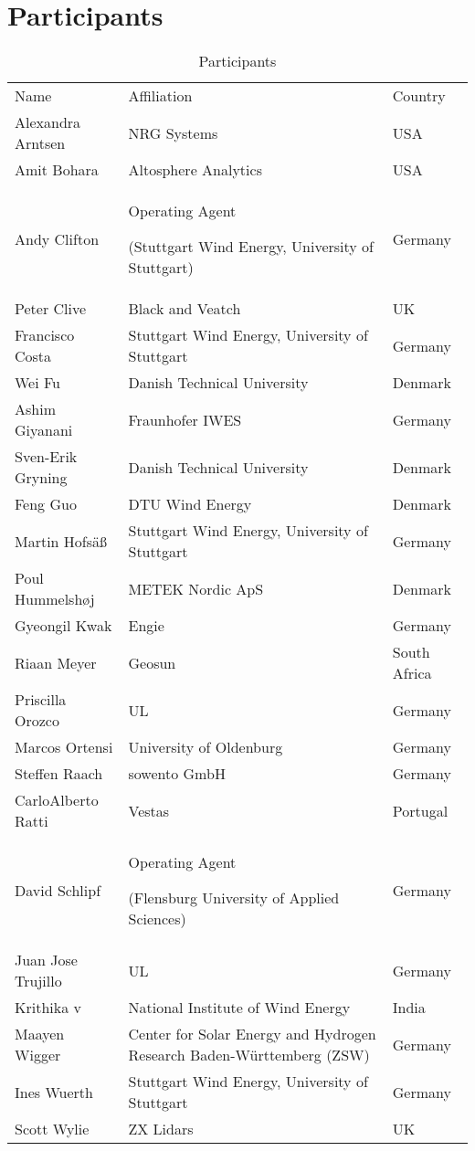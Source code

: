 \section*{Participants}

\begin{table*}[!h]
    \centering
    \caption{Participants}
    \begin{tabular}{@{}|p{}|p{}|p{}|@{}}
    \rowcolor{Task32Blue2} Name & Affiliation & Country \\
	Alexandra Arntsen & NRG Systems & USA \\
	Amit Bohara & Altosphere Analytics & USA \\
	Andy Clifton & Operating Agent

(Stuttgart Wind Energy, University of Stuttgart) & Germany \\
	Peter Clive & Black and Veatch & UK \\
	Francisco Costa & Stuttgart Wind Energy, University of Stuttgart &
Germany \\
	Wei Fu & Danish Technical University & Denmark \\
	Ashim Giyanani & Fraunhofer IWES & Germany \\
	Sven-Erik Gryning & Danish Technical University & Denmark \\
Feng Guo & DTU Wind Energy & Denmark \\
Martin Hofs\"aß & Stuttgart Wind Energy, University of Stuttgart &
Germany \\
	Poul Hummelshøj & METEK Nordic ApS & Denmark \\
	Gyeongil Kwak & Engie & Germany \\
	Riaan Meyer & Geosun & South Africa \\
	Priscilla Orozco & UL & Germany \\
	Marcos Ortensi & University of Oldenburg & Germany \\
	Steffen Raach &
		sowento GmbH & Germany \\
	CarloAlberto Ratti & Vestas & Portugal \\
	David Schlipf & 
		Operating Agent

		(Flensburg University of Applied Sciences) & Germany \\
	Juan Jose Trujillo & UL & Germany \\
	Krithika v &
		National Institute of Wind Energy & India \\
	Maayen Wigger & Center for Solar Energy and Hydrogen Research Baden-Württemberg (ZSW) & Germany \\
	Ines Wuerth & Stuttgart Wind Energy, University of Stuttgart & Germany \\
	Scott Wylie & ZX Lidars & UK \\
	\end{tabular}
\label{tab:participants}
\end{table*}
